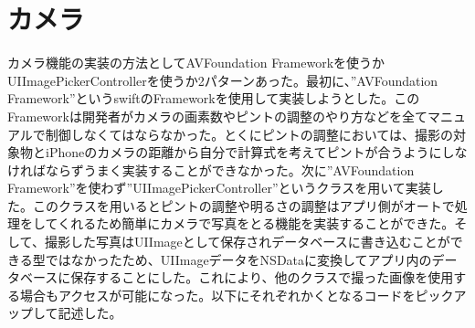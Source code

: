 \section{カメラ}
カメラ機能の実装の方法としてAVFoundation Frameworkを使うかUIImagePickerControllerを使うか2パターンあった。最初に、”AVFoundation Framework”というswiftのFrameworkを使用して実装しようとした。このFrameworkは開発者がカメラの画素数やピントの調整のやり方などを全てマニュアルで制御しなくてはならなかった。とくにピントの調整においては、撮影の対象物とiPhoneのカメラの距離から自分で計算式を考えてピントが合うようにしなければならずうまく実装することができなかった。次に”AVFoundation Framework”を使わず”UIImagePickerController”というクラスを用いて実装した。このクラスを用いるとピントの調整や明るさの調整はアプリ側がオートで処理をしてくれるため簡単にカメラで写真をとる機能を実装することができた。そして、撮影した写真はUIImageとして保存されデータベースに書き込むことができる型ではなかったため、UIImageデータをNSDataに変換してアプリ内のデータベースに保存することにした。これにより、他のクラスで撮った画像を使用する場合もアクセスが可能になった。以下にそれぞれかくとなるコードをピックアップして記述した。

